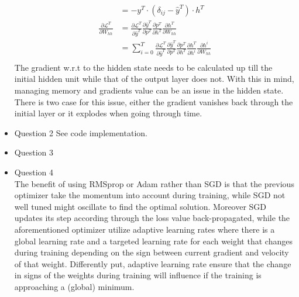\documentclass{article}
\begin{document}
\begin{itemize}
\begin{align*}
      &= - y^T \cdot \left(\delta_{ij} - \hat{y}^T \right) \cdot h^T \\
      \frac{\partial \mathcal{L}^T}{\partial W_{hh}} &= \frac{\partial\mathcal{L}^T}{\partial \hat{y}^T} \frac{\partial \hat{y}^T}{\partial p^T}  \frac{\partial p^T}{\partial h^T} \frac{\partial h^T}{\partial W_{hh}} \\
      &= \sum_{i = 0}^{T}\frac{\partial\mathcal{L}^T}{\partial \hat{y}^T} \frac{\partial \hat{y}^T}{\partial p^T}  \frac{\partial p^T}{\partial h^T} \frac{\partial h^T}{\partial h^i} \frac{\partial h^i}{\partial W_{hh}} \\
    \end{align*}
    The gradient w.r.t to the hidden state needs to be calculated up till the initial hidden unit while that of the output layer does not. With this in mind, managing memory and gradients value can be an issue in the hidden state. There is two case for this issue, either the gradient vanishes back through the initial layer or it explodes when going through time. 
    \item Question 2 See code implementation. 
    \item Question 3
    \item Question 4 \\
    The benefit of using RMSprop or Adam rather than SGD is that the previous optimizer take the momentum into account during training, while SGD not well tuned might oscillate to find the optimal solution. Moreover SGD updates its step according through the loss value  back-propagated, while the aforementioned optimizer utilize adaptive learning rates where there is a global learning rate and a targeted learning rate for each weight that changes during training depending on the sign between current gradient and velocity of that weight. Differently put, adaptive learning rate ensure that the change in signs of the weights during training will influence if the training is approaching a (global) minimum.  
\end{itemize}
\end{document}
